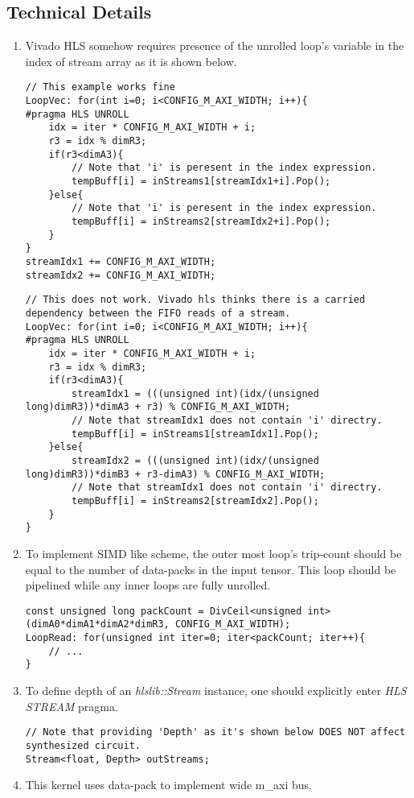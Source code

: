\subsection{Technical Details}
\begin{enumerate}
\item Vivado HLS somehow requires presence of the unrolled loop's variable in the index of stream array as it is shown below.
\begin{lstlisting}
// This example works fine
LoopVec: for(int i=0; i<CONFIG_M_AXI_WIDTH; i++){
#pragma HLS UNROLL
	idx = iter * CONFIG_M_AXI_WIDTH + i;
	r3 = idx % dimR3;
	if(r3<dimA3){
		// Note that 'i' is peresent in the index expression.
		tempBuff[i] = inStreams1[streamIdx1+i].Pop();
	}else{
		// Note that 'i' is peresent in the index expression.
		tempBuff[i] = inStreams2[streamIdx2+i].Pop();
	}
}
streamIdx1 += CONFIG_M_AXI_WIDTH;
streamIdx2 += CONFIG_M_AXI_WIDTH;
\end{lstlisting}
\begin{lstlisting}
// This does not work. Vivado hls thinks there is a carried dependency between the FIFO reads of a stream.
LoopVec: for(int i=0; i<CONFIG_M_AXI_WIDTH; i++){
#pragma HLS UNROLL
	idx = iter * CONFIG_M_AXI_WIDTH + i;
	r3 = idx % dimR3;
	if(r3<dimA3){
		streamIdx1 = (((unsigned int)(idx/(unsigned long)dimR3))*dimA3 + r3) % CONFIG_M_AXI_WIDTH;
		// Note that streamIdx1 does not contain 'i' directry.
		tempBuff[i] = inStreams1[streamIdx1].Pop();
	}else{
		streamIdx2 = (((unsigned int)(idx/(unsigned long)dimR3))*dimB3 + r3-dimA3) % CONFIG_M_AXI_WIDTH;
		// Note that streamIdx1 does not contain 'i' directry.
		tempBuff[i] = inStreams2[streamIdx2].Pop();
	}
}
\end{lstlisting}

\item To implement SIMD like scheme, the outer most loop's trip-count should be equal to the number of data-packs in the input tensor. This loop should be pipelined while any inner loops are fully unrolled. 
\begin{lstlisting}
const unsigned long packCount = DivCeil<unsigned int>(dimA0*dimA1*dimA2*dimR3, CONFIG_M_AXI_WIDTH);
LoopRead: for(unsigned int iter=0; iter<packCount; iter++){
	// ...
}
\end{lstlisting}

\item To define depth of an \emph{hlslib::Stream} instance, one should explicitly enter \emph{HLS STREAM} pragma.
\begin{lstlisting}
// Note that providing 'Depth' as it's shown below DOES NOT affect synthesized circuit.
Stream<float, Depth> outStreams;
\end{lstlisting}

\item This kernel uses data-pack to implement wide m\_axi bus.
\end{enumerate}



